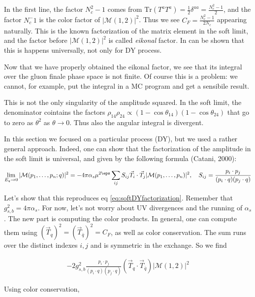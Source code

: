 \documentclass[11pt]{report}
\begin{document}
In the first line, the factor \(N_c^2-1\) comes from \(\text{Tr}(T^a T^a) = \frac{1}{2}\delta^{aa} = \frac{N_c^2 -1}{2}\), and the factor \(N_c^-1\) is the color factor of \(|\mathcal{M}(1, 2)|^2\). Thus we see \(C_F = \frac{N_c^2 -1}{2N_c}\) appearing naturally. This is the known factorization of the matrix element in the soft limit, and the factor before \(|\mathcal{M}(1, 2)|^2\) is called \emph{eikonal} factor. In can be shown that this is happens universally, not only for DY process.

Now that we have properly obtained the eikonal factor, we see that its integral over the gluon finale phase space is not finite. Of course this is a problem: we cannot, for example, put the integral in a MC program and get a sensibile result. 

This is not the only singularity of the amplitude squared. In the soft limit, the denominator cointains the factors \(\rho_{14}\rho_{24}\propto (1-\cos\theta_{14})(1-\cos\theta_{24})\) that go to zero as \(\theta^{2}\) as \(\theta \to 0\). Thus also the angular integral is divergent. 

In this section we focused on a particular process (DY), but we used a rather general approach. Indeed, one can show that the factorization of the amplitude in the soft limit is universal, and given by the following formula (Catani, 2000): 

\begin{align}
    \label{eq:Catanisoftfact}
    \lim_{E_q \to 0 }|\mathcal{M}(p_1, \ldots, p_n; q)|^2 = -4\pi\alpha_s \mu^{2\eps}\sum_{ij}S_{ij}\vec{T}_i \cdot \vec{T}_j |\mathcal{M}(p_1, \ldots, p_n)|^2, \quad S_{ij} = \frac{p_i\cdot p_j}{(p_i\cdot q)(p_j \cdot q)}
\end{align}

Let's show that this reproduces eq \ref{eq:softDYfactorization}. Remember that \(g_{s, b}^2 = 4\pi\alpha_s\). For now, let's not worry about UV divergences and the running of \(\alpha_s\). The new part is computing the color products. In general, one can compute them using \((\vec{T}_q)^2 = (\vec{T}_{\bar{q}})^2 = C_F\), as well as color conservation. The sum runs over the distinct indexes \(i, j\) and is symmetric in the exchange. So we find 

\begin{align}
    -2g_{s, b}^2 \frac{p_i\cdot p_j}{(p_i\cdot q)(p_j\cdot q)}(\vec{T}_q \cdot \vec{T}_{\bar{q}})|\mathcal{M}(1, 2)|^2 
\end{align}

Using color conservation, 
\end{document}
